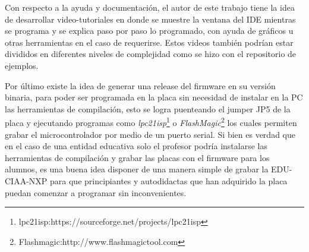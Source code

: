 Con respecto a la ayuda y documentación, el autor de este trabajo tiene la idea de desarrollar video-tutoriales en donde se muestre la ventana del IDE mientras se programa y se explica paso por paso lo programado, con ayuda de gráficos u otras herramientas en el caso de requerirse. Estos videos también podrían estar divididos en diferentes niveles de complejidad como se hizo con el repositorio de ejemplos.

Por último existe la idea de generar una release del firmware en su versión binaria, para poder ser programada en la placa sin necesidad de instalar en la PC las herramientas de compilación, esto se logra puenteando el jumper JP5 de la placa y ejecutando programas como \textit{lpc21isp}\footnote{lpc21isp:https://sourceforge.net/projects/lpc21isp} o \textit{FlashMagic}\footnote{Flashmagic:http://www.flashmagictool.com} los cuales permiten grabar el microcontrolador por medio de un puerto serial. Si bien es verdad que en el caso de una entidad educativa solo el profesor podría instalarse las herramientas de compilación y grabar las placas con el firmware para los alumnos, es una buena idea disponer de una manera simple de grabar la EDU-CIAA-NXP para que principiantes y autodidactas que han adquirido la placa puedan comenzar a programar sin inconvenientes.


 



